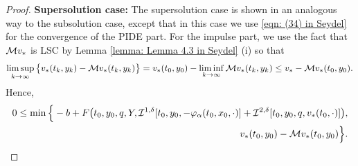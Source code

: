 \begin{proof}
    \textbf{Supersolution case:} The supersolution case is shown in an analogous way to the subsolution case, except that in this case we use \eqref{eqn: (34) in Seydel} for the convergence of the PIDE part. For the impulse part, we use the fact that $\mathcal{M} v_*$ is LSC by Lemma \ref{lemma: Lemma 4.3 in Seydel} (i) so that
    \begin{equation*}
        \limsup_{k \rightarrow \infty} \big\{ v_*(t_k,y_k) - \mathcal{M} v_*(t_k,y_k)\big\} = v_*(t_0,y_0) - \liminf_{k \rightarrow \infty} \mathcal{M} v_*(t_k,y_k) \leq v_* - \mathcal{M} v_*(t_0,y_0).
    \end{equation*}
    Hence,
    \begin{align*}
        0 \leq \min \Big\{ -b + F\big(t_0, y_0, q, Y, \mathcal{I}^{1, \delta} [t_0,y_0,-\varphi_\alpha (t_0, x_0, \cdot)] + \mathcal{I}^{2, \delta} [t_0,y_0,q,v_*(t_0,\cdot)] \big), \\
        v_*(t_0,y_0) - \mathcal{M} v_* (t_0,y_0) \Big\}.
    \end{align*}
\end{proof}

